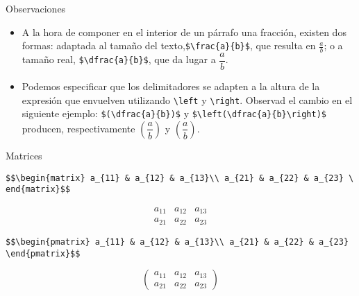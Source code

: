 \documentclass[
  ignorenonframetext,
]{beamer}
\begin{document}
\begin{frame}[fragile]{Observaciones}
\protect\hypertarget{observaciones}{}

\begin{itemize}
\item
  A la hora de componer en el interior de un párrafo una fracción,
  existen dos formas: adaptada al tamaño del
  texto,\texttt{\$\textbackslash{}frac\{a\}\{b\}\$}, que resulta en
  \(\frac{a}{b}\); o a tamaño real,
  \texttt{\$\textbackslash{}dfrac\{a\}\{b\}\$}, que da lugar a
  \(\dfrac{a}{b}\).
\item
  Podemos especificar que los delimitadores se adapten a la altura de la
  expresión que envuelven utilizando \texttt{\textbackslash{}left} y
  \texttt{\textbackslash{}right}. Observad el cambio en el siguiente
  ejemplo: \texttt{\$(\textbackslash{}dfrac\{a\}\{b\})\$} y
  \texttt{\$\textbackslash{}left(\textbackslash{}dfrac\{a\}\{b\}\textbackslash{}right)\$}
  producen, respectivamente \((\dfrac{a}{b})\) y
  \(\left(\dfrac{a}{b}\right)\).
\end{itemize}

\end{frame}

\begin{frame}[fragile]{Matrices}
\protect\hypertarget{matrices}{}

\texttt{\$\$\textbackslash{}begin\{matrix\}\ a\_\{11\}\ \&\ a\_\{12\}\ \&\ a\_\{13\}\textbackslash{}\textbackslash{}\ a\_\{21\}\ \&\ a\_\{22\}\ \&\ a\_\{23\}\ \textbackslash{}end\{matrix\}\$\$}

\[\begin{matrix}
a_{11} & a_{12} & a_{13}\\
a_{21} & a_{22} & a_{23}
\end{matrix}\]

\texttt{\$\$\textbackslash{}begin\{pmatrix\}\ a\_\{11\}\ \&\ a\_\{12\}\ \&\ a\_\{13\}\textbackslash{}\textbackslash{}\ a\_\{21\}\ \&\ a\_\{22\}\ \&\ a\_\{23\}\ \textbackslash{}end\{pmatrix\}\$\$}

\[\begin{pmatrix}
a_{11} & a_{12} & a_{13}\\
a_{21} & a_{22} & a_{23}
\end{pmatrix}\]

\end{frame}
\end{document}
